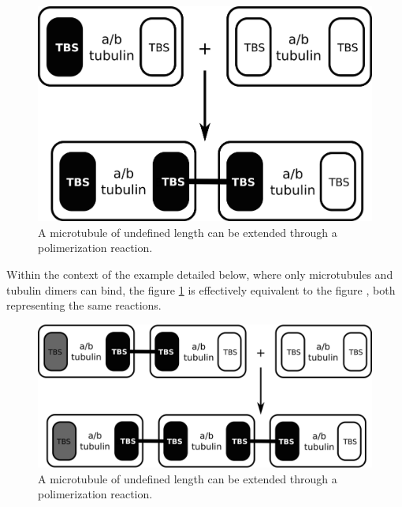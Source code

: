 \begin{figure}[H]
\begin{center}
\includegraphics{figs/pngs/microtubule.png}
\caption{A microtubule of undefined length can be extended through a polimerization reaction.}
\label{fig:microtubule2}
\end{center}
\end{figure}

Within the context of the example detailed below, where only microtubules and tubulin dimers can bind, the figure \ref{fig:microtubule2} is effectively equivalent to the figure \label{fig:microtubule3}, both representing the same reactions.

\begin{figure}[H]
\begin{center}
\includegraphics{figs/pngs/microtubule-alt.png}
\caption{A microtubule of undefined length can be extended through a polimerization reaction.}
\label{fig:microtubule3}
\end{center}
\end{figure}

